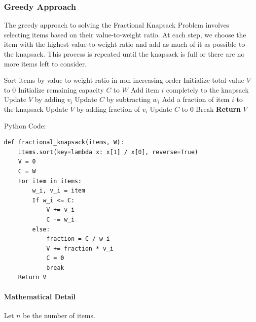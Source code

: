 \documentclass[12pt]{book} %
\begin{document}
\subsubsection{Greedy Approach}

The greedy approach to solving the Fractional Knapsack Problem involves selecting items based on their value-to-weight ratio. At each step, we choose the item with the highest value-to-weight ratio and add as much of it as possible to the knapsack. This process is repeated until the knapsack is full or there are no more items left to consider.
\FloatBarrier %
\begin{algorithm}
\caption{Fractional Knapsack}
\begin{algorithmic}[1]
    \State Sort items by value-to-weight ratio in non-increasing order
    \State Initialize total value $V$ to $0$
    \State Initialize remaining capacity $C$ to $W$
            \State Add item $i$ completely to the knapsack
            \State Update $V$ by adding $v_i$
            \State Update $C$ by subtracting $w_i$
        \Else
            \State Add a fraction of item $i$ to the knapsack
            \State Update $V$ by adding fraction of $v_i$
            \State Update $C$ to $0$
            \State Break
        \EndIf
    \EndFor
    \State \textbf{Return} $V$ 
\EndProcedure
\end{algorithmic}
\end{algorithm}
\FloatBarrier %
Python Code:
\FloatBarrier %
\begin{verbatim}
def fractional_knapsack(items, W):
    items.sort(key=lambda x: x[1] / x[0], reverse=True)
    V = 0
    C = W
    For item in items:
        w_i, v_i = item
        If w_i <= C:
            V += v_i
            C -= w_i
        else:
            fraction = C / w_i
            V += fraction * v_i
            C = 0
            break
    Return V
\end{verbatim}
\FloatBarrier %
\paragraph{Mathematical Detail}

Let $n$ be the number of items.
\end{document}
